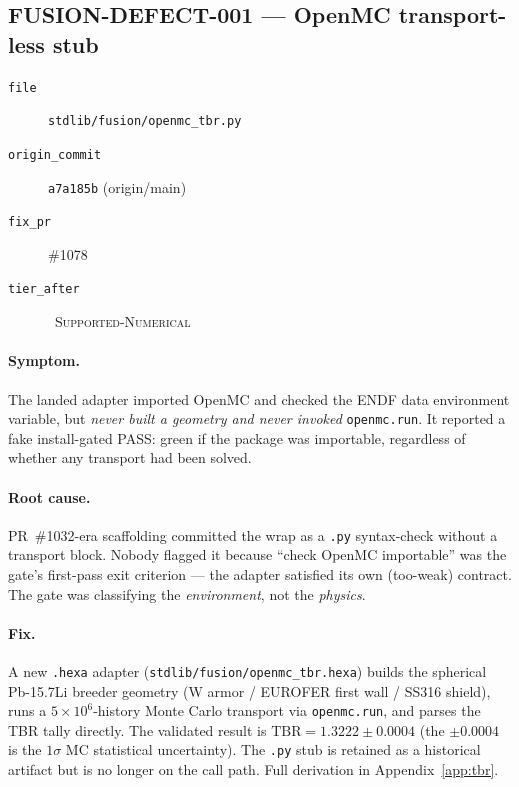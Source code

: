 \subsection{FUSION-DEFECT-001 --- OpenMC transport-less stub}
\label{app:adapters:openmc}

\begin{description}
  \item[\texttt{file}] \texttt{stdlib/fusion/openmc\_tbr.py}
  \item[\texttt{origin\_commit}] \texttt{a7a185b} (origin/main)
  \item[\texttt{fix\_pr}] \#1078
  \item[\texttt{tier\_after}] \tierGreen\ \textsc{Supported-Numerical}
\end{description}

\paragraph{Symptom.}
The landed adapter imported OpenMC and checked the ENDF data
environment variable, but \emph{never built a geometry and never invoked}
\verb|openmc.run|. It reported a fake install-gated PASS: green if the
package was importable, regardless of whether any transport had been
solved.

\paragraph{Root cause.}
PR~\#1032-era scaffolding committed the wrap as a \verb|.py|
syntax-check without a transport block. Nobody flagged it because
``check OpenMC importable'' was the gate's first-pass exit criterion ---
the adapter satisfied its own (too-weak) contract. The gate was
classifying the \emph{environment}, not the \emph{physics}.

\paragraph{Fix.}
A new \verb|.hexa| adapter (\verb|stdlib/fusion/openmc_tbr.hexa|) builds
the spherical Pb-15.7Li breeder geometry (W armor / EUROFER first wall /
SS316 shield), runs a $5\times10^{6}$-history Monte Carlo transport via
\verb|openmc.run|, and parses the TBR tally directly. The validated
result is $\text{TBR} = 1.3222 \pm 0.0004$ (the $\pm0.0004$ is the
$1\sigma$ MC statistical uncertainty). The \verb|.py| stub is retained
as a historical artifact but is no longer on the call path. Full
derivation in Appendix~\ref{app:tbr}.

